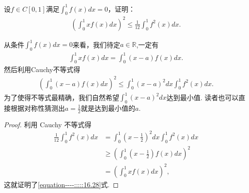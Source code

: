 \documentclass[../../main.tex]{subfiles}
\begin{document}
\begin{example}
设\(f \in C[0,1]\)满足\(\int_{0}^{1}f(x)dx = 0\)，证明：
\begin{align*}
\left(\int_{0}^{1}xf(x)dx\right)^2 \leqslant \frac{1}{12}\int_{0}^{1}f^{2}(x)dx. \label{equation----:::::16.28}
\end{align*}
\end{example}
\begin{note}
从条件\(\int_{0}^{1}f(x)dx = 0\)来看，我们待定\(a \in \mathbb{R}\),一定有
\begin{align*}
\int_{0}^{1}xf(x)dx = \int_{0}^{1}(x - a)f(x)dx.
\end{align*}
然后利用Cauchy不等式得
\begin{align*}
\left(\int_{0}^{1}(x - a)f(x)dx\right)^2 \leqslant \int_{0}^{1}(x - a)^2dx\int_{0}^{1}f^{2}(x)dx.
\end{align*}
为了使得不等式最精确，我们自然希望\(\int_{0}^{1}(x - a)^2dx\)达到最小值. 读者也可以直接根据对称性猜测出\(a = \frac{1}{2}\)就是达到最小值的\(a\).
\end{note}
\begin{proof}
利用 Cauchy 不等式得
\begin{align*}
\frac{1}{12}\int_{0}^{1}f^{2}(x)dx&=\int_{0}^{1}\left(x - \frac{1}{2}\right)^2dx\int_{0}^{1}f^{2}(x)dx\\
&\geqslant \left(\int_{0}^{1}\left(x - \frac{1}{2}\right)f(x)dx\right)^2\\
&=\left(\int_{0}^{1}xf(x)dx\right)^2,
\end{align*}
这就证明了\eqref{equation----:::::16.28}式.
\end{proof}
\end{document}
